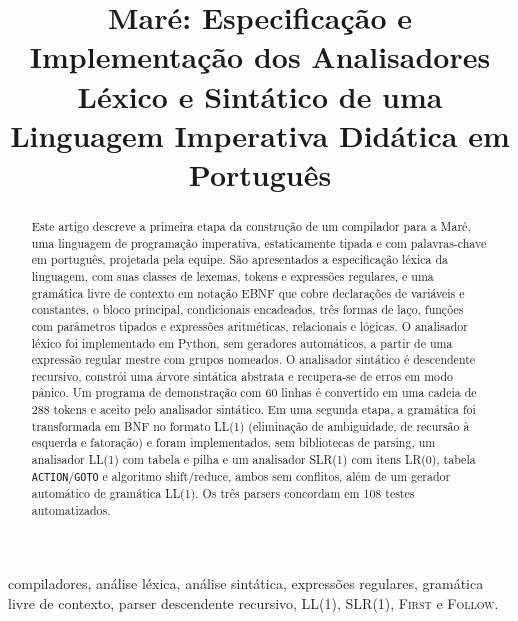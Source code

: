 \documentclass[conference]{IEEEtran}
\begin{document}
\title{Maré: Especificação e Implementação dos Analisadores Léxico e Sintático de uma Linguagem Imperativa Didática em Português}

\author{
}

\maketitle

\begin{abstract}
Este artigo descreve a primeira etapa da construção de um compilador para a
Maré, uma linguagem de programação imperativa, estaticamente tipada e com
palavras-chave em português, projetada pela equipe. São apresentados a
especificação léxica da linguagem, com suas classes de lexemas, tokens e
expressões regulares, e uma gramática livre de contexto em notação EBNF que
cobre declarações de variáveis e constantes, o bloco principal, condicionais
encadeados, três formas de laço, funções com parâmetros tipados e expressões
aritméticas, relacionais e lógicas. O analisador léxico foi implementado em
Python, sem geradores automáticos, a partir de uma expressão regular mestre
com grupos nomeados. O analisador sintático é descendente recursivo, constrói
uma árvore sintática abstrata e recupera-se de erros em modo pânico. Um
programa de demonstração com 60 linhas é convertido em uma cadeia de 288 tokens
e aceito pelo analisador sintático. Em uma segunda etapa, a gramática foi
transformada em BNF no formato LL(1) (eliminação de ambiguidade, de recursão
à esquerda e fatoração) e foram implementados, sem bibliotecas de parsing, um
analisador LL(1) com tabela e pilha e um analisador SLR(1) com itens LR(0),
tabela \texttt{ACTION}/\texttt{GOTO} e algoritmo shift/reduce, ambos sem
conflitos, além de um gerador automático de gramática LL(1). Os três parsers
concordam em 108 testes automatizados.
\end{abstract}

\begin{IEEEkeywords}
compiladores, análise léxica, análise sintática, expressões regulares,
gramática livre de contexto, parser descendente recursivo, LL(1), SLR(1), \textsc{First} e \textsc{Follow}.
\end{IEEEkeywords}
\end{document}
